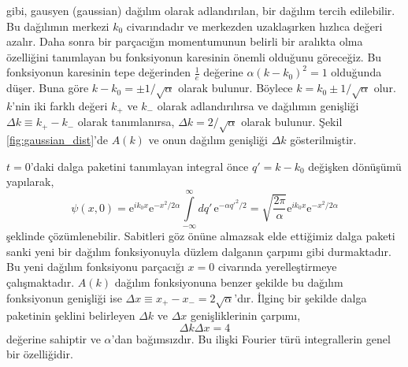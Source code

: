 \documentclass[a4paper,12pt, twoside]{article}
\begin{document}
gibi, gausyen (gaussian) dağılım olarak adlandırılan, bir dağılım tercih edilebilir. Bu dağılımın merkezi $k_0$ civarındadır ve merkezden uzaklaşırken hızlıca değeri azalır. Daha sonra bir parçacığın momentumunun belirli bir aralıkta olma özelliğini tanımlayan bu fonksiyonun karesinin önemli olduğunu göreceğiz. Bu fonksiyonun karesinin tepe değerinden $\frac{1}{e}$ değerine $\alpha (k-k_0)^2 = 1$ olduğunda düşer. Buna göre $k-k_0 = \pm 1/\sqrt{\alpha}$ olarak bulunur. Böylece $k = k_0 \pm 1/\sqrt{\alpha}$ olur. $k$'nin iki farklı değeri $k_{+}$ ve $k_{-}$ olarak adlandırılırsa ve dağılımın genişliği $\Delta k \equiv k_{+} - k_{-}$ olarak tanımlanırsa, $\Delta k = 2/\sqrt \alpha$ olarak bulunur. Şekil \ref{fig:gaussian_dist}'de $A(k)$ ve onun dağılım genişliği $\Delta k$ gösterilmiştir.

$t=0$'daki dalga paketini tanımlayan integral önce $q' = k-k_0$ değişken dönüşümü yapılarak,
\begin{equation}
\psi(x, 0) = \text{e}^{ik_0x} \text{e}^{-x^2/2\alpha} \int\limits_{-\infty}^{\infty}dq' \, \text{e}^{-\alpha q'^2/2} = \sqrt{\frac{2\pi}{\alpha}} \text{e}^{ik_0x} \text{e}^{-x^2/2\alpha}
\label{eq:wave_packet_t0}
\end{equation}
şeklinde çözümlenebilir. Sabitleri göz önüne almazsak elde ettiğimiz dalga paketi sanki yeni bir dağılım fonksiyonuyla düzlem dalganın çarpımı gibi durmaktadır. Bu yeni dağılım fonksiyonu parçacığı $x=0$ civarında yerelleştirmeye çalışmaktadır. $A(k)$ dağılım fonksiyonuna benzer şekilde bu dağılım fonksiyonun genişliği ise $\Delta x \equiv  x_{+} - x_{-} = 2\sqrt{\alpha}$'dır. İlginç bir şekilde dalga paketinin şeklini belirleyen $\Delta k$ ve $\Delta x$ genişliklerinin çarpımı,
\begin{equation}
\Delta k  \Delta x  = 4
\label{eq:del_x_k}
\end{equation}
değerine sahiptir ve $\alpha$'dan bağımsızdır. Bu ilişki Fourier türü integrallerin genel bir özelliğidir.
\end{document}
